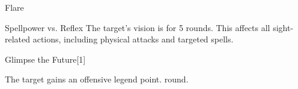 \begin{spellsection}{Flare}
    \begin{spellheader}
    \end{spellheader}
    \begin{spellcontent}
        \begin{spelltargetinginfo}
        \end{spelltargetinginfo}
        \begin{spelleffects}
            \begin{spellattack}{Spellpower vs. Reflex}
                \spellsuccess The target's vision is \impaired for 5 rounds. This affects all sight-related actions, including physical attacks and targeted spells.
            \end{spellattack}
        \end{spelleffects}
    \end{spellcontent}
    \begin{spellfooter}
    \end{spellfooter}
\end{spellsection}

\begin{spellsection}{Glimpse the Future}[1]
    \begin{spellheader}
    \end{spellheader}
    \begin{spellcontent}
        \begin{spelltargetinginfo}
        \end{spelltargetinginfo}
        \begin{spelleffects}
            \spelleffect The target gains an offensive legend point.
             round.
        \end{spelleffects}
    \end{spellcontent}
    \begin{spellfooter}
    \end{spellfooter}
\end{spellsection}

